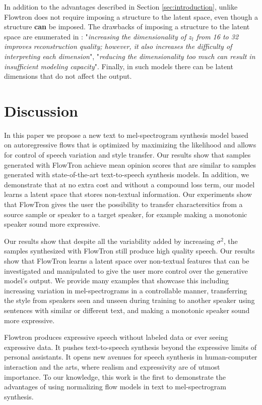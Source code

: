 \documentclass{article}
\begin{document}
In addition to the advantages described in Section \ref{sec:introduction}, unlike \cite{wang2018style,skerry2018towards, hsu2018hierarchical,akuzawa2018expressive} Flowtron does not require imposing a structure to the latent space, even though a structure \textbf{can} be imposed. The drawbacks of imposing a structure to the latent space are enumerated in \cite{wang2018style,skerry2018towards, hsu2018hierarchical}: "\textit{increasing the dimensionality of $z_l$ from 16 to 32 improves reconstruction quality; however, it also increases the difficulty of interpreting each dimension}", "\textit{reducing the dimensionality too much can result in insufficient modeling capacity}". Finally, in such models there can be latent dimensions that do not affect the output.
\fi  \section{Discussion}\label{sec:discussion}
In this paper we propose a new text to mel-spectrogram synthesis model based on autoregressive flows that is optimized by maximizing the likelihood and allows for control of speech variation and style transfer. Our results show that samples generated with FlowTron achieve mean opinion scores that are similar to samples generated with state-of-the-art text-to-speech synthesis models. In addition, we demonstrate that at no extra cost and without a compound loss term, our model learns a latent space that stores non-textual information. Our experiments show that FlowTron gives the user the possibility to transfer charactersitics from a source sample or speaker to a target speaker, for example making a monotonic speaker sound more expressive. 

Our results show that despite all the variability added by increasing $\sigma^2$, the samples synthesized with FlowTron still produce high quality speech. Our results show that FlowTron learns a latent space over non-textual features that can be investigated and manipulated to give the user more control over the generative model’s output. We provide many examples that showcase this including increasing variation in mel-spectrograms in a controllable manner, transferring the style from speakers seen and unseen during training to another speaker using sentences with similar or different text, and making a monotonic speaker sound more expressive. 

Flowtron produces expressive speech without labeled data or ever seeing expressive data. It pushes text-to-speech synthesis beyond the expressive limits of personal assistants. It opens new avenues for speech synthesis in human-computer interaction and the arts, where realism and expressivity are of utmost importance. To our knowledge, this work is the first to demonstrate the advantages of using normalizing flow models in text to mel-spectrogram synthesis. 

\newpage



\newpage
\end{document}
